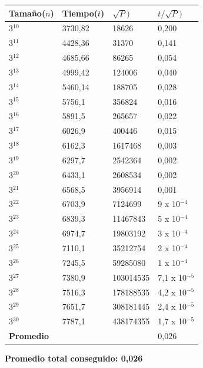 \begin{table}[H]

    \begin{tabular}{ | l | l |l | l |}
    \hline
	Tamaño($n$) & Tiempo($t$) & \textbf{$\sqrt{P})$} & \textbf{$t/\sqrt{P})$}  \\ \hline
3$^{10}$ & 3730,82 & 18626 	& 0,200 \\ \hline
3$^{11}	$ & 4428,36 & 31370 &	0,141 \\ \hline
3$^{12}$ & 4685,66 & 86265  &	 0,054 \\ \hline
3$^{13}	$ & 4999,42 & 124006 &	0,040 \\ \hline
3$^{14}$	 & 5460,14	& 188705 & 0,028 \\ \hline
3$^{15}$ & 	5756,1 & 	356824 & 0,016 \\ \hline
3$^{16}$	 & 5891,5 & 265657  & 0,022 \\ \hline
3$^{17}	$ & 6026,9 &	400446 & 0,015 \\ \hline
3$^{18}$	 & 6162,3 &	1617468 & 0,003 \\ \hline
3$^{19}	$ & 6297,7 & 2542364 &	0,002 \\ \hline
3$^{20}$	 & 6433,1 & 2608534 &	 0,002 \\ \hline
3$^{21}$ & 	6568,5 & 3956914 &	0,001 \\ \hline
3$^{22}$	 & 6703,9 & 7124699 & 	9 x 10$^{-4}$ \\ \hline
3$^{23}	$ & 6839,3 & 11467843	 & 5 x 10$^{-4}$ \\ \hline
3$^{24}$ & 	6974,7 & 19803192 & 	3 x 10$^{-4}$ \\ \hline
3$^{25}	$ & 7110,1 & 35212754 & 	2 x 10$^{-4}$ \\ \hline
3$^{26}$	 & 7245,5 & 59285080 & 1 x 10$^{-4}$ \\ \hline
3$^{27}$ &	7380,9 & 103014535 & 7,1 x 10$^{-5}$ \\ \hline
3$^{28}$	 & 7516,3 &	178188535 & 4,2 x 10$^{-5}$ \\ \hline
3$^{29}$ &	7651,7 & 308181445	& 2,4 x 10$^{-5}$ \\ \hline
3$^{30}$ &	7787,1 & 438174355 &	1,7 x 10$^{-5}$ \\ \hline

    \textbf{Promedio} & & & 0,026  \\ \hline

    \end{tabular}
\end{table}

    \textbf{Promedio total conseguido: 0,026}  \\

